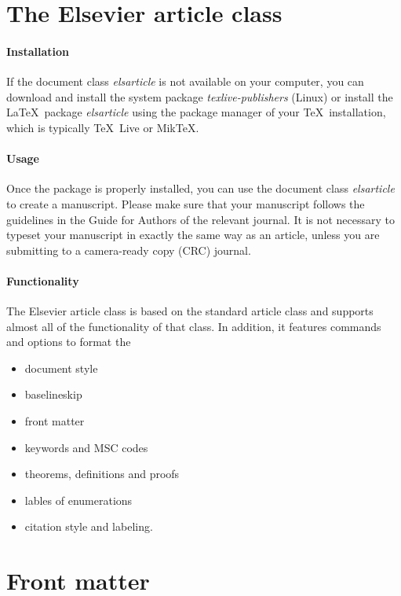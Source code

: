 \documentclass[review]{elsarticle}
\begin{document}
\linenumbers

\section{The Elsevier article class}

\paragraph{Installation} If the document class \emph{elsarticle} is not available on your computer, you can download and install the system package \emph{texlive-publishers} (Linux) or install the \LaTeX\ package \emph{elsarticle} using the package manager of your \TeX\ installation, which is typically \TeX\ Live or Mik\TeX.

\paragraph{Usage} Once the package is properly installed, you can use the document class \emph{elsarticle} to create a manuscript. Please make sure that your manuscript follows the guidelines in the Guide for Authors of the relevant journal. It is not necessary to typeset your manuscript in exactly the same way as an article, unless you are submitting to a camera-ready copy (CRC) journal.

\paragraph{Functionality} The Elsevier article class is based on the standard article class and supports almost all of the functionality of that class. In addition, it features commands and options to format the
\begin{itemize}
\item document style
\item baselineskip
\item front matter
\item keywords and MSC codes
\item theorems, definitions and proofs
\item lables of enumerations
\item citation style and labeling.
\end{itemize}

\section{Front matter}
\end{document}
